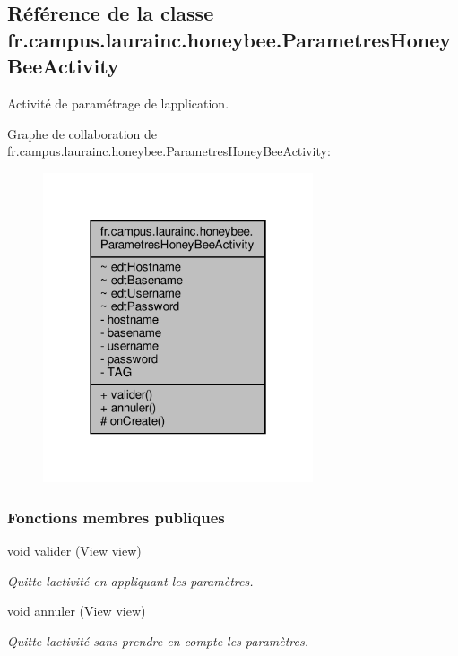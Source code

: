 \hypertarget{classfr_1_1campus_1_1laurainc_1_1honeybee_1_1_parametres_honey_bee_activity}{}\subsection{Référence de la classe fr.\+campus.\+laurainc.\+honeybee.\+Parametres\+Honey\+Bee\+Activity}
\label{classfr_1_1campus_1_1laurainc_1_1honeybee_1_1_parametres_honey_bee_activity}


Activité de paramétrage de l\textquotesingle{}application.  




Graphe de collaboration de fr.\+campus.\+laurainc.\+honeybee.\+Parametres\+Honey\+Bee\+Activity\+:\nopagebreak
\begin{figure}[H]
\begin{center}
\leavevmode
\includegraphics[width=226pt]{classfr_1_1campus_1_1laurainc_1_1honeybee_1_1_parametres_honey_bee_activity__coll__graph}
\end{center}
\end{figure}
\subsubsection*{Fonctions membres publiques}
\begin{DoxyCompactItemize}
\item 
void \hyperlink{classfr_1_1campus_1_1laurainc_1_1honeybee_1_1_parametres_honey_bee_activity_a75d00ffbc312cbbee09bfe4e7d5153c1}{valider} (View view)
\begin{DoxyCompactList}\small\item\em Quitte l\textquotesingle{}activité en appliquant les paramètres. \end{DoxyCompactList}\item 
void \hyperlink{classfr_1_1campus_1_1laurainc_1_1honeybee_1_1_parametres_honey_bee_activity_a1db4c582af1057bf1577b1f7a74ea8fe}{annuler} (View view)
\begin{DoxyCompactList}\small\item\em Quitte l\textquotesingle{}activité sans prendre en compte les paramètres. \end{DoxyCompactList}\end{DoxyCompactItemize}
